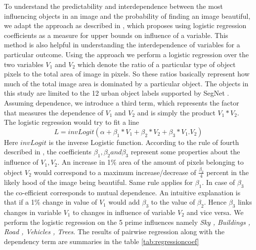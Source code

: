 To understand the predictability and interdependence between the most influencing objects in an image and the probability of finding an image beautiful, we adapt the approach as described in \cite{vaughn2008data},
which proposes using logistic regression coefficients as a measure for upper bounds on influence of a variable. This method is also helpful in understanding the interdependence of variables for a particular outcome. 
Using the approach we perform a logistic regression over the two variables $V_1$ and $V_2$ which denote the ratio of a particular type of object pixels to the total area of image in pixels. So these ratios basically represent how much of the total image area is dominated by a particular object. The objects in this study are limited to the 12 urban object labels supported by SegNet \cite{badrinarayanan2015segnet}.
Assuming dependence, we introduce  a third term, which represents the factor that measures the dependence of $V_1$ and $V_2$ and is simply the product $V_1 * V_2 $.
The logistic regression would try to fit a line 
\begin{equation}
L = invLogit(\alpha + \beta_1 * V_1 + \beta_2 * V_2  + \beta_3 * V_{1}.V_{2} )
\label{eq:regression} 
\end{equation}
Here $invLogit$ is the inverse Logistic function. According to the rule of fourth described in \cite{vaughn2008data} , the coefficients $ \beta_1, \beta_2 and \beta_3 $ represent some properties about the influence of $ V_1, V_2 $. An increase in 1\% area of the amount of pixels belonging to object $ V_2 $ would correspond to a maximum increase/decrease of $\frac{\beta_2}{4}$ percent in the likely hood of the image being beautiful. Same rule applies for $\beta_1$. In case of $\beta_3$ the co-efficient corresponds to mutual dependence. An intuitive explanation is that if a 1\% change in value of $V_1$ would add $\beta_3$ to the value of $\beta_2$. Hence $\beta_3$ links changes in variable $V_1$ to changes in influence of variable $V_2$ and vice versa.
We perform the logistic regression on the 5 prime influences namely \textit{Sky , Buildings , Road , Vehicles , Trees}. The results of pairwise regression along with the dependency term are summaries in the table \ref{tab:regressioncoef}
